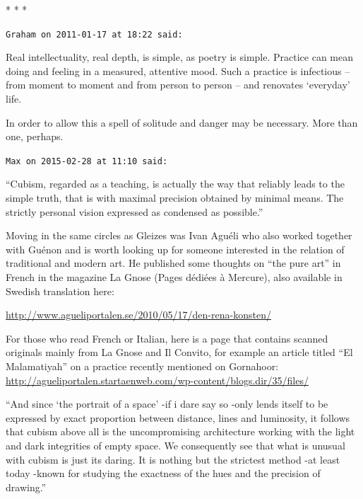 
\begin{center}* * *\end{center}

\begin{footnotesize}
\begin{sffamily}
\texttt{Graham on 2011-01-17 at 18:22 said:}

Real intellectuality, real depth, is simple, as poetry is simple. Practice can mean doing and feeling in a measured, attentive mood. Such a practice is infectious -- from moment to moment and from person to person -- and renovates `everyday' life.

In order to allow this a spell of solitude and danger may be necessary. More than one, perhaps.

\hfill

\texttt{Max on 2015-02-28 at 11:10 said:}

``Cubism, regarded as a teaching, is actually the way that reliably leads to the simple truth, that is with maximal precision obtained by minimal means. The strictly personal vision expressed as condensed as possible.''

Moving in the same circles as Gleizes was Ivan Aguéli who also worked together with Guénon and is worth looking up for someone interested in the relation of traditional and modern art. He published some thoughts on ``the pure art'' in French in the magazine La Gnose (Pages dédiées à Mercure), also available in Swedish translation here:

\url{http://www.agueliportalen.se/2010/05/17/den-rena-konsten/}

For those who read French or Italian, here is a page that contains scanned originals mainly from La Gnose and Il Convito, for example an article titled ``El Malamatiyah'' on a practice recently mentioned on Gornahoor:
\url{http://agueliportalen.startaenweb.com/wp-content/blogs.dir/35/files/}


``And since `the portrait of a space' -if i dare say so -only lends itself to be expressed by exact proportion between distance, lines and luminosity, it follows that cubism above all is the uncompromising architecture working with the light and dark integrities of empty space. We consequently see that what is unusual with cubism is just its daring. It is nothing but the strictest method -at least today -known for studying the exactness of the hues and the precision of drawing.''


\end{sffamily}
\end{footnotesize}
